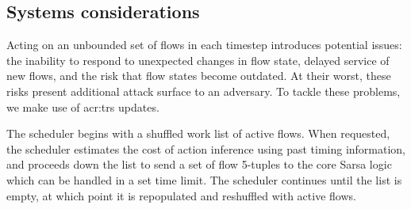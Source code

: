 \subsection{Systems considerations}\label{sec:systems-considerations}
%
%

Acting on an unbounded set of flows in each timestep introduces potential issues: the inability to respond to unexpected changes in flow state, delayed service of new flows, and the risk that flow states become outdated.
At their worst, these risks present additional attack surface to an adversary.
To tackle these problems, we make use of \gls{acr:trs} updates.

The scheduler begins with a shuffled work list of active flows.
When requested, the scheduler estimates the cost of action inference using past timing information, and proceeds down the list to send a set of flow 5-tuples to the core Sarsa logic which can be handled in a set time limit.
The scheduler continues until the list is empty, at which point it is repopulated and reshuffled with active flows.

